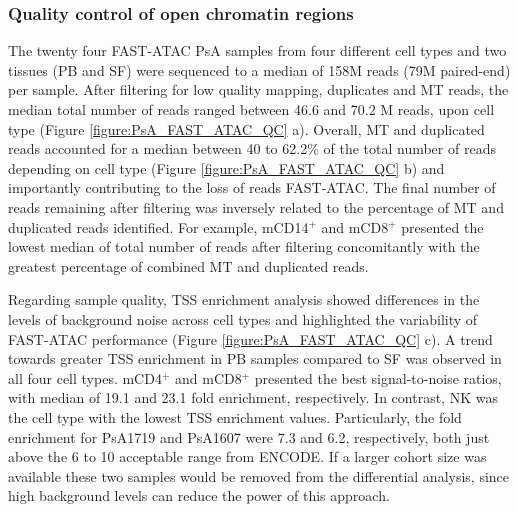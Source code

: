 \subsubsection{Quality control of open chromatin regions}
The twenty four FAST-ATAC PsA samples from four different cell types and two tissues (PB and SF) were sequenced to a median of 158M reads (79M paired-end) per sample. After filtering for low quality mapping, duplicates and MT reads, the median total number of reads ranged between 46.6 and 70.2 M reads, upon cell type (Figure \ref{figure:PsA_FAST_ATAC_QC} a).  Overall, MT and duplicated reads accounted for a median between 40 to 62.2\% of the total number of reads depending on cell type (Figure \ref{figure:PsA_FAST_ATAC_QC} b) and importantly contributing to the loss of reads FAST-ATAC. The final number of reads remaining after filtering was inversely related to the percentage of MT and duplicated reads identified. For example, mCD14$^+$ and mCD8$^+$ presented the lowest median of total number of reads after filtering concomitantly with the greatest percentage of combined MT and duplicated reads. 

Regarding sample quality, TSS enrichment analysis showed differences in the levels of background noise across cell types and highlighted the variability of FAST-ATAC performance (Figure \ref{figure:PsA_FAST_ATAC_QC} c). A trend towards greater TSS enrichment in PB samples compared to SF was observed in all four cell types. mCD4$^+$ and mCD8$^+$ presented the best signal-to-noise ratios, with median of 19.1 and 23.1 fold enrichment, respectively. In contrast, NK was the cell type with the lowest TSS enrichment values. Particularly, the fold enrichment for PsA1719 and PsA1607 were 7.3 and 6.2, respectively, both just above the 6 to 10 acceptable range from ENCODE. If a larger cohort size was available these two samples would be removed from the differential analysis, since high background levels can reduce the power of this approach. 

